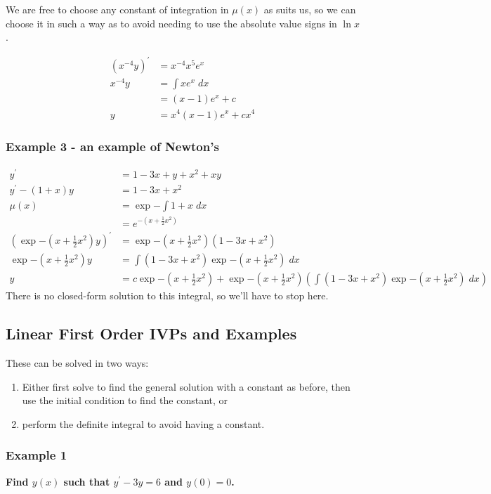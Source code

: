 \documentclass[11pt]{article}
\newcommand{\yp}{y^{\prime}}
\begin{document}
	We are free to choose any constant of integration in $\mu(x)$ as suits us, so we can choose it in such a way as to avoid needing to use the absolute value signs in $\ln{x}$.

	\begin{align*}
		(x^{-4} y)^{\prime} &= x^{-4} x^5 e^x \\
		x^{-4} y &= \int x e^x \; dx \\
			&= (x - 1) e^x + c \\
		y &= x^4 (x-1) e^x + c x^4
	\end{align*}

\subsubsection{Example 3 - an example of Newton's}
	\begin{align*}
		\yp &= 1 -3x + y + x^2 + xy \\
		\yp - (1 + x)y &= 1 - 3x + x^2 \\
		\mu(x) &= \exp{- \int 1 + x \; dx} \\
			&= e^{-(x + \frac{1}{2} x^2)} \\
		(\exp{-(x + \frac{1}{2} x^2)} y)^{\prime} &= \exp{-(x + \frac{1}{2} x^2)} (1 - 3x + x^2) \\
		\exp{-(x + \frac{1}{2} x^2)} y &= \int (1 - 3x + x^2) \exp{-(x + \frac{1}{2} x^2)} \; dx \\
		y &= c \exp{-(x + \frac{1}{2} x^2)} + \exp{-(x + \frac{1}{2} x^2)} \left( \int (1- 3x + x^2) \exp{-(x + \frac{1}{2} x^2)} \; dx \right)
	\end{align*}
	There is no closed-form solution to this integral, so we'll have to stop here.

\subsection{Linear First Order IVPs and Examples}
	These can be solved in two ways:
		\begin{enumerate}
			\item Either first solve to find the general solution with a constant as before, then use the initial condition to find the constant, or
			\item perform the definite integral to avoid having a constant.
		\end{enumerate}

\subsubsection{Example 1}
	\textbf{Find $y(x)$ such that $\yp - 3y = 6$ and $y(0) = 0$.}
\end{document}
